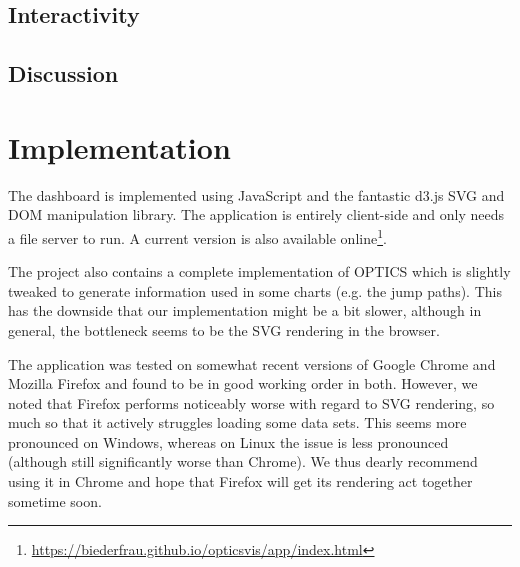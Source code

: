 \documentclass{vgtc}                          %
\begin{document}
\subsection{Interactivity}

\subsection{Discussion}



\section{Implementation} %

The dashboard is implemented using JavaScript and the fantastic d3.js SVG and DOM
manipulation library. The application is entirely client-side and only needs a
file server to run. A current version is also available
online\footnote{\url{https://biederfrau.github.io/opticsvis/app/index.html}}.

The project also contains a complete implementation of OPTICS which is slightly tweaked to
generate information used in some charts (e.g. the jump paths). This has the downside
that our implementation might be a bit slower, although in general, the bottleneck seems
to be the SVG rendering in the browser.

The application was tested on somewhat recent versions of Google Chrome and Mozilla Firefox
and found to be in good working order in both. However, we noted that Firefox performs noticeably
worse with regard to SVG rendering, so much so that it actively struggles loading
some data sets. This seems more pronounced on Windows, whereas on Linux the issue is less pronounced
(although still significantly worse than Chrome). We thus dearly recommend using it in
Chrome and hope that Firefox will get its rendering act together sometime soon.
\end{document}
